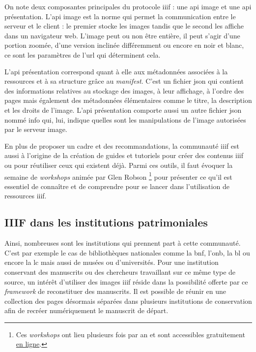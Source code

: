 	On note deux composantes principales du protocole \acrshort{iiif} : une \acrshort{api} image et une \acrshort{api} présentation. L'\acrshort{api} image est la norme qui permet la communication entre le serveur et le client : le premier stocke les images tandis que le second les affiche dans un navigateur web. L'image peut ou non être entière, il peut s'agir d'une portion zoomée, d'une version inclinée différemment ou encore en noir et blanc, ce sont les paramètres de l'\acrshort{url} qui déterminent cela. 

    L'\acrshort{api} présentation correspond quant à elle aux métadonnées associées à la ressources et à sa structure grâce au \textit{manifest}. C'est un fichier \acrshort{json} qui contient des informations relatives au stockage des images, à leur affichage, à l'ordre des pages mais également des métadonnées élémentaires comme le titre, la description et les droits de l'image. L'\acrshort{api} présentation comporte aussi un autre fichier \acrshort{json} nommé info qui, lui, indique quelles sont les manipulations de l'image autorisées par le serveur image. 
    
    En plus de proposer un cadre et des recommandations, la communauté \acrshort{iiif} est aussi à l'origine de la création de guides et tutoriels pour créer des contenus \acrshort{iiif} ou pour réutiliser ceux qui existent déjà. Parmi ces outils, il faut évoquer la semaine de \textit{workshops} animée par Glen Robson \footnote{Ces \textit{workshops} ont lieu plusieurs fois par an et sont accessibles gratuitement \href{https://training.iiif.io/iiif-online-workshop/}{en ligne}.} pour présenter ce qu'il est essentiel de connaître et de comprendre pour se lancer dans l'utilisation de ressources \acrshort{iiif}.

	\subsection{IIIF dans les institutions patrimoniales}
	Ainsi, nombreuses sont les institutions qui prennent part à cette communauté. C'est par exemple le cas de bibliothèques nationales comme la \acrlong{bnf}, l'\acrlong{onb}, la \acrlong{bl} ou encore la \acrlong{lc} mais aussi de musées ou d'universités. Pour une institution conservant des manuscrits ou des chercheurs travaillant sur ce même type de source, un intérêt d'utiliser des images \acrshort{iiif} réside dans la possibilité offerte par ce \textit{framework} de reconstituer des manuscrits. Il est possible de réunir en une collection des pages désormais séparées dans plusieurs institutions de conservation afin de recréer numériquement le manuscrit de départ. 
	
